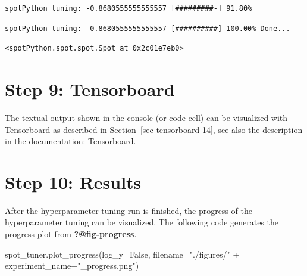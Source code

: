 \documentclass[
  letterpaper,
  DIV=11,
  numbers=noendperiod]{scrreprt}
\newenvironment{Shaded}{\begin{snugshade}}{\end{snugshade}}
\newcommand{\NormalTok}[1]{\textcolor[rgb]{0.00,0.23,0.31}{#1}}
\newcommand{\OperatorTok}[1]{\textcolor[rgb]{0.37,0.37,0.37}{#1}}
\newcommand{\StringTok}[1]{\textcolor[rgb]{0.13,0.47,0.30}{#1}}
\newcommand{\VariableTok}[1]{\textcolor[rgb]{0.07,0.07,0.07}{#1}}
\begin{document}
\begin{verbatim}
spotPython tuning: -0.8680555555555557 [#########-] 91.80% 
\end{verbatim}

\begin{verbatim}
spotPython tuning: -0.8680555555555557 [##########] 100.00% Done...
\end{verbatim}

\begin{verbatim}
<spotPython.spot.spot.Spot at 0x2c01e7eb0>
\end{verbatim}

\hypertarget{sec-tensorboard-17}{%
\section{Step 9: Tensorboard}\label{sec-tensorboard-17}}

The textual output shown in the console (or code cell) can be visualized
with Tensorboard as described in Section~\ref{sec-tensorboard-14}, see
also the description in the documentation:
\href{https://sequential-parameter-optimization.github.io/spotPython/14_spot_ray_hpt_torch_cifar10.html\#sec-tensorboard-14}{Tensorboard.}

\hypertarget{sec-results-tuning-17}{%
\section{Step 10: Results}\label{sec-results-tuning-17}}

After the hyperparameter tuning run is finished, the progress of the
hyperparameter tuning can be visualized. The following code generates
the progress plot from \textbf{?@fig-progress}.

\begin{Shaded}
\begin{Highlighting}[]
\NormalTok{spot\_tuner.plot\_progress(log\_y}\OperatorTok{=}\VariableTok{False}\NormalTok{,}
\NormalTok{    filename}\OperatorTok{=}\StringTok{"./figures/"} \OperatorTok{+}\NormalTok{ experiment\_name}\OperatorTok{+}\StringTok{"\_progress.png"}\NormalTok{)}
\end{Highlighting}
\end{Shaded}
\end{document}
